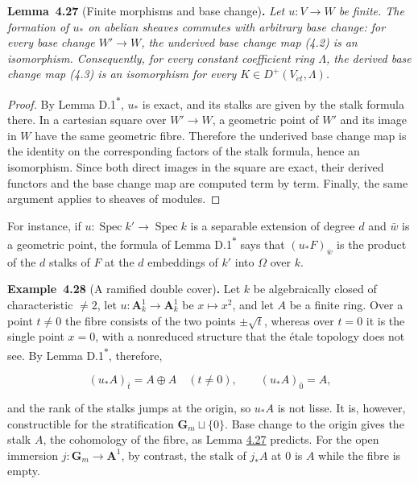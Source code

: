 \documentclass[11pt]{article}
\newenvironment{bpstatement}[2]{\par\addvspace{0.6\baselineskip}\noindent\textbf{#1}#2\textbf{.}\enspace\ignorespaces}
  {\par\addvspace{0.4\baselineskip}}
\newenvironment{bpstatementit}[2]{\begin{bpstatement}{#1}{#2}\itshape\ignorespaces}{\end{bpstatement}}
\newcommand{\bpout}[1]{#1\textsuperscript{\hyperlink{bp-outside}{\ensuremath{\ast}}}}
\begin{document}
\label{bp80}%
\begin{bpstatementit}{Lemma~4.27}{ (Finite morphisms and base change)}
Let \(u:V\to W\) be finite. The formation of \(u_*\) on abelian sheaves commutes with arbitrary base change: for every base change \(W'\to W\), the underived base change map (4.2) is an isomorphism. Consequently, for every constant coefficient ring \(\Lambda\), the derived base change map (4.3) is an isomorphism for every \(K\in D^+(V_{\acute{e}t},\Lambda)\).
\end{bpstatementit}

\begin{proof}[{Proof}]\label{bp81}%
By Lemma \bpout{D.1}, \(u_*\) is exact, and its stalks are given by the stalk formula there. In a cartesian square over \(W'\to W\), a geometric point of \(W'\) and its image in \(W\) have the same geometric fibre. Therefore the underived base change map is the identity on the corresponding factors of the stalk formula, hence an isomorphism. Since both direct images in the square are exact, their derived functors and the base change map are computed term by term. Finally, the same argument applies to sheaves of modules.
\end{proof}

\label{bp82}%
For instance, if \(u:\operatorname{Spec}k'\to\operatorname{Spec}k\) is a separable extension of degree \(d\) and \(\bar w\) is a geometric point, the formula of Lemma \bpout{D.1} says that \((u_*F)_{\bar w}\) is the product of the \(d\) stalks of \(F\) at the \(d\) embeddings of \(k'\) into \(\Omega\) over \(k\).

\label{bp83}%
\begin{bpstatement}{Example~4.28}{ (A ramified double cover)}
Let \(k\) be algebraically closed of characteristic \(\neq2\), let \(u:\mathbf A^1_k\to\mathbf A^1_k\) be \(x\mapsto x^2\), and let \(A\) be a finite ring. Over a point \(t\neq0\) the fibre consists of the two points \(\pm\sqrt t\), whereas over \(t=0\) it is the single point \(x=0\), with a nonreduced structure that the étale topology does not see. By Lemma \bpout{D.1}, therefore,

\[
(u_*A)_{\bar t}=A\oplus A\quad(t\neq0),\qquad (u_*A)_{\bar0}=A,
\]

and the rank of the stalks jumps at the origin, so \(u_*A\) is not lisse. It is, however, constructible for the stratification \(\mathbf G_m\sqcup\{0\}\). Base change to the origin gives the stalk \(A\), the cohomology of the fibre, as Lemma \hyperref[bp80]{4.27} predicts. For the open immersion \(j:\mathbf G_m\to\mathbf A^1\), by contrast, the stalk of \(j_*A\) at \(0\) is \(A\) while the fibre is empty.
\end{bpstatement}
\end{document}

